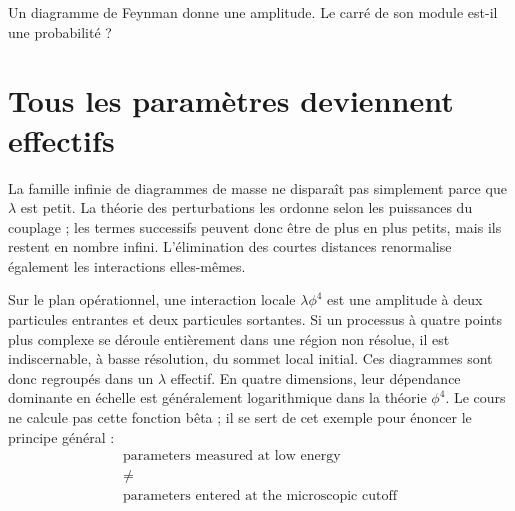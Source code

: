 \begin{classroomqa}Un diagramme de Feynman donne une amplitude. Le carré de son module est-il une probabilité ?
\end{classroomqa}

\section{Tous les paramètres deviennent effectifs}

La famille infinie de diagrammes de masse ne disparaît pas simplement parce que \(\lambda\) est petit. La théorie des perturbations les ordonne selon les puissances du couplage ; les termes successifs peuvent donc être de plus en plus petits, mais ils restent en nombre infini. L’élimination des courtes distances renormalise également les interactions elles-mêmes.

\begin{classroomqa}
\end{classroomqa}

Sur le plan opérationnel, une interaction locale \(\lambda\phi^4\) est une amplitude à deux particules entrantes et deux particules sortantes. Si un processus à quatre points plus complexe se déroule entièrement dans une région non résolue, il est indiscernable, à basse résolution, du sommet local initial. Ces diagrammes sont donc regroupés dans un \(\lambda\) effectif. En quatre dimensions, leur dépendance dominante en échelle est généralement logarithmique dans la théorie \(\phi^4\). Le cours ne calcule pas cette fonction bêta ; il se sert de cet exemple pour énoncer le principe général :
\begin{equation}
\begin{gathered}
\text{parameters measured at low energy}\\
\ne\\
\text{parameters entered at the microscopic cutoff}
\end{gathered}
\end{equation}

